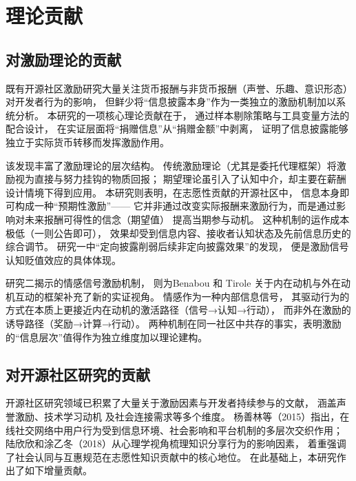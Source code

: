 \documentclass[
    type = master, %
    degree = professional,        %
    decl-page,  %
    twoside,                %
    fontset = fandol %
  ]{njuthesis}
\begin{document}
\section{理论贡献}

\subsection{对激励理论的贡献}

既有开源社区激励研究大量关注货币报酬与非货币报酬（声誉、乐趣、意识形态）
对开发者行为的影响\cite{lerner2002simple,shah2006motivation}，
但鲜少将“信息披露本身”作为一类独立的激励机制加以系统分析。
本研究的一项核心理论贡献在于，
通过样本剔除策略与工具变量方法的配合设计，
在实证层面将“捐赠信息”从“捐赠金额”中剥离，
证明了信息披露能够独立于实际货币转移而发挥激励作用。

该发现丰富了激励理论的层次结构。
传统激励理论（尤其是委托代理框架）将激励视为直接与努力挂钩的物质回报；
期望理论虽引入了认知中介，却主要在薪酬设计情境下得到应用。
本研究则表明，在志愿性贡献的开源社区中，
信息本身即可构成一种“预期性激励”——
它并非通过改变实际报酬来激励行为，而是通过影响对未来报酬可得性的信念（期望值）
提高当期参与动机\cite{vroom1964work}。
这种机制的运作成本极低（一则公告即可），
效果却受到信息内容、接收者认知状态及先前信息历史的综合调节。
研究一中“定向披露削弱后续非定向披露效果”的发现，
便是激励信号认知贬值效应的具体体现\cite{oliver1980cognitive}。

研究二揭示的情感信号激励机制，
则为Benabou 和 Tirole \citeyear{benabou2003intrinsic}
关于内在动机与外在动机互动的框架补充了新的实证视角。
情感作为一种内部信息信号，
其驱动行为的方式在本质上更接近内在动机的激活路径（信号→认知→行动），
而非外在激励的诱导路径（奖励→计算→行动）。
两种机制在同一社区中共存的事实，表明激励的“信息层次”值得作为独立维度加以理论建构。

\subsection{对开源社区研究的贡献}

开源社区研究领域已积累了大量关于激励因素与开发者持续参与的文献，
涵盖声誉激励\cite{lerner2002simple}、技术学习动机\cite{fang2009understanding}
及社会连接需求\cite{yang2021differential}等多个维度。
杨善林等（2015）指出，在线社交网络中用户行为受到信息环境、社会影响和平台机制的多层次交织作用\cite{yang2015social}；
陆欣欣和涂乙冬（2018）从心理学视角梳理知识分享行为的影响因素，
着重强调了社会认同与互惠规范在志愿性知识贡献中的核心地位\cite{lu2018sharing}。
在此基础上，本研究作出了如下增量贡献。
\end{document}
